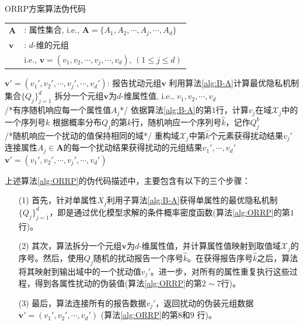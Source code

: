 \begin{algorithm}[htbp]
 \small
\caption{ORRP方案算法伪代码}
\label{alg:ORRP}
\begin{algorithmic}[1]
\REQUIRE
\begin{tabular}[t]{p{3mm}l}
 $\bm{A}$&: 属性集合, i.e., $\bm{A}=\{A_1,A_2,\cdots,A_j,\cdots,A_d\}$\\
 $\bm{v}$&: $d$-维的元组 \\
 & i.e., $\bm{v}=(v_1,v_2,\cdots,v_j,\cdots,v_d)$, $(1\leq j\leq d)$
\end{tabular}
\ENSURE $\bm{v}'=(v_1',v_2',\cdots,v_j',\cdots,v_d')$: 报告扰动元组$\bm{v}$
\STATE 利用算法\ref{alg:B-A}计算最优隐私机制集合$\{Q_j\}_{j=1}^d$
\STATE 拆分一个元组$\bm{v}$为$d$-维属性值, i.e., $v_1,v_2,\cdots,v_d$ \\ /*有序随机响应每一个属性值$A_j$*/
\STATE 依据算法\ref{alg:B-A}的第$1$行，计算$v_j$在域$\mathcal{X}_j$中的一个序列号$k$
\STATE 根据概率分布$Q_{j}$的第$k$行，随机响应一个序列号$\hat{k}$，记作$Q_{j}^{k}$ \\
/*随机响应一个扰动的值保持相同的域*/
\STATE 重构域$\mathcal{X}_j$中第$\hat{k}$个元素获得扰动结果$v_j'$
\ENDFOR
\STATE 连接属性$A_j\in \bm{A}$的每一个扰动结果获得扰动的元组结果$v_1',\cdots,v_d'$
\RETURN $\bm{v}'=(v_1',v_2',\cdots,v_j',\cdots,v_d')$
\end{algorithmic}
\end{algorithm}

上述算法\ref{alg:ORRP}的伪代码描述中，主要包含有以下的三个步骤：

\begin{itemize}
	\item[(1)] 首先，针对单属性$X_j$利用子算法\ref{alg:B-A}获得单属性的最优隐私机制$\{Q_j\}_{j=1}^{d}$，即是通过优化模型求解的条件概率密度函数(算法\ref{alg:ORRP}的第$1$行)。
	
	\item [(2)] 其次，算法拆分一个元组$\bm{v}$为$d$-维属性值，并计算属性值映射到取值域$\mathcal{X}_j$的序号。然后，使用$Q_j$随机的扰动报告一个序号$\hat{k}$。在获得报告序号$\hat{k}$之后，算法将其映射到输出域中的一个扰动值$v_{j}'$。进一步，对所有的属性重复执行这些过程，得到各属性扰动的伪装值(算法\ref{alg:ORRP}的第$2\sim 7$行)。
	
	\item[(3)]最后，算法连接所有的报告数据$v_j'$，返回扰动的伪装元组数据$\bm{v}' = (v_1',v_2',\cdots,v_d')$ (算法\ref{alg:ORRP}的第$8$和$9$ 行)。
\end{itemize}

